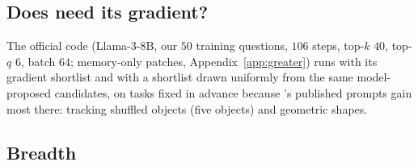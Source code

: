 \subsection{Does \greater{} need its gradient?}
\label{sec:exp-greater}
The official \greater{} code (Llama-3-8B, our $50$ training questions, $106$ steps, top-$k$ $40$,
top-$q$ $6$, batch $64$; memory-only patches, Appendix~\ref{app:greater}) runs with its gradient
shortlist and with a shortlist drawn uniformly from the same model-proposed candidates, on tasks
fixed in advance because \greater{}'s published prompts gain most there: tracking shuffled objects
(five objects) and geometric shapes. 

\subsection{Breadth}
\label{sec:exp-breadth}
